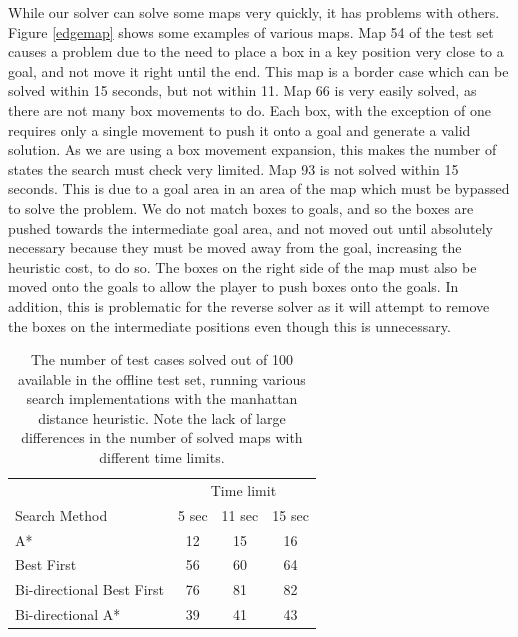 \documentclass[a4paper,11pt]{article}
\begin{document}
While our solver can solve some maps very quickly, it has problems with
others. Figure \ref{edgemap} shows some examples of various maps. Map 54 of the
test set causes a problem due to the need to place a box in a key position very
close to a goal, and not move it right until the end. This map is a border case
which can be solved within 15 seconds, but not within 11. Map 66 is very easily
solved, as there are not many box movements to do. Each box, with the exception
of one requires only a single movement to push it onto a goal and generate a
valid solution. As we are using a box movement expansion, this makes the number
of states the search must check very limited. Map 93 is not solved within 15
seconds. This is due to a goal area in an area of the map which must be bypassed
to solve the problem. We do not match boxes to goals, and so the boxes are
pushed towards the intermediate goal area, and not moved out until absolutely
necessary because they must be moved away from the goal, increasing the
heuristic cost, to do so. The boxes on the right side of the map must also be
moved onto the goals to allow the player to push boxes onto the goals. In
addition, this is problematic for the reverse solver as it will attempt to
remove the boxes on the intermediate positions even though this is unnecessary.

\begin{table}
  \centering
  \begin{tabular}{lccc}
    & \multicolumn{3}{c}{Time limit}\\
    \cline{2-4}
    Search Method              &  5 sec  &  11 sec  &  15 sec  \\
    \hline
    A*                         &     12  &      15  &      16  \\
    Best First                 &     56  &      60  &      64  \\
    Bi-directional Best First  &     76  &      81  &      82  \\
    Bi-directional A*          &     39  &      41  &      43  \\
  \end{tabular}

  \caption{The number of test cases solved out of 100 available in the offline
    test set, running various search implementations with the manhattan distance
    heuristic. Note the lack of large differences in the number of solved maps
    with different time limits.}
  \label{fig:passedtests}
\end{table}
\end{document}
